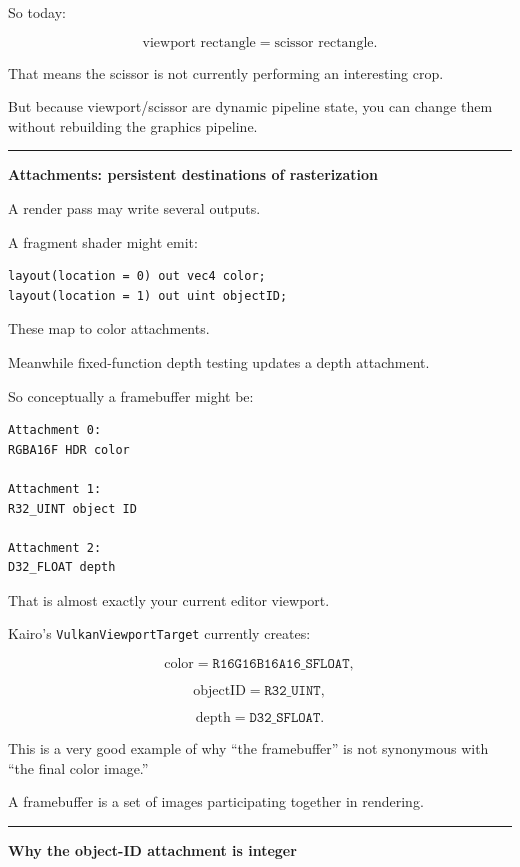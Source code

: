 So today:

\[
\text{viewport rectangle}
=
\text{scissor rectangle}.
\]

That means the scissor is not currently performing an interesting crop.

But because viewport/scissor are dynamic pipeline state, you can change them without rebuilding the graphics pipeline.

\begin{center}\rule{0.5\linewidth}{0.5pt}\end{center}

\textbf{Attachments: persistent destinations of rasterization}

A render pass may write several outputs.

A fragment shader might emit:

\begin{verbatim}
layout(location = 0) out vec4 color;
layout(location = 1) out uint objectID;
\end{verbatim}

These map to color attachments.

Meanwhile fixed-function depth testing updates a depth attachment.

So conceptually a framebuffer might be:

\begin{verbatim}
Attachment 0:
RGBA16F HDR color

Attachment 1:
R32_UINT object ID

Attachment 2:
D32_FLOAT depth
\end{verbatim}

That is almost exactly your current editor viewport.

Kairo's \texttt{VulkanViewportTarget} currently creates:

\[
\text{color} = \texttt{R16G16B16A16\_SFLOAT},
\]

\[
\text{objectID} = \texttt{R32\_UINT},
\]

\[
\text{depth} = \texttt{D32\_SFLOAT}.
\]

This is a very good example of why ``the framebuffer'' is not synonymous with ``the final color image.''

A framebuffer is a set of images participating together in rendering.

\begin{center}\rule{0.5\linewidth}{0.5pt}\end{center}

\textbf{Why the object-ID attachment is integer}

